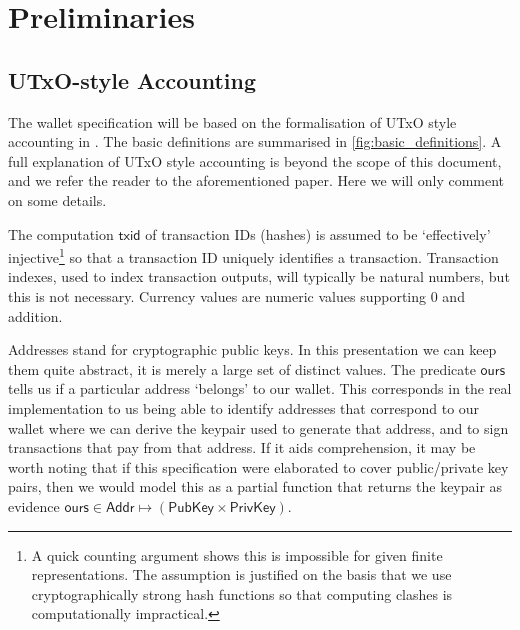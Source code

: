 \documentclass{article}
\theoremstyle{definition}{
  \newtheorem{lemma}{Lemma}[section] %
  \newtheorem{definition}[lemma]{Definition}
}
\theoremstyle{theorem}{
  \newtheorem{invariant}[lemma]{Invariant}
  \newtheorem{proofobligation}[lemma]{Proof Obligation}
}
\numberwithin{equation}{lemma}
\begin{document}

\section{Preliminaries}

\subsection{UTxO-style Accounting}

The wallet specification will be based on the formalisation of UTxO style
accounting in \citep{utxo_accounting}. The basic definitions are summarised in
\cref{fig:basic_definitions}. A full explanation of UTxO style accounting
is beyond the scope of this document, and we refer the reader to the
aforementioned paper. Here we will only comment on some details.

The computation $\mathsf{txid}$ of transaction IDs (hashes) is assumed to be
`effectively' injective\footnote{A quick counting argument shows this is
impossible for given finite representations. The assumption is justified on the
basis that we use cryptographically strong hash functions so that computing
clashes is computationally impractical.} so that a transaction ID uniquely
identifies a transaction. Transaction indexes, used to index transaction
outputs, will typically be natural numbers, but this is not necessary. Currency
values are numeric values supporting 0 and addition.

Addresses stand for cryptographic public keys. In this presentation we can keep
them quite abstract, it is merely a large set of distinct values. The predicate
$\mathsf{ours}$ tells us if a particular address `belongs' to our wallet.
This corresponds in the real implementation to us being able to identify
addresses that correspond to our wallet where we can derive the keypair used
to generate that address, and to sign transactions that pay from that address.
If it aids comprehension, it may be worth noting that if this specification
were elaborated to cover public/private key pairs, then we would model this as
a partial function that returns the keypair as evidence
$\mathsf{ours} \in \mathsf{Addr} \mapsto (\mathsf{PubKey} \times \mathsf{PrivKey})$.
\end{document}
